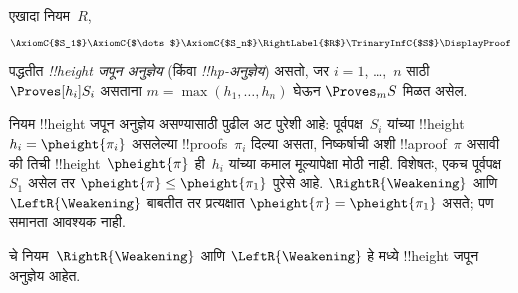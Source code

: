 \documentclass[../../../include/open-logic-section]{subfiles}
\begin{document}
\begin{defn}
एखादा नियम~$R$,
\[
\AxiomC{$S_1$}
\AxiomC{$\dots$}
\AxiomC{$S_n$}
\RightLabel{$R$}
\TrinaryInfC{$S$}
\DisplayProof
\]
पद्धतीत \emph{!!{height} जपून अनुज्ञेय} (किंवा
\emph{!!{hp}-अनुज्ञेय}) असतो, जर $i = 1$, \dots,~$n$
साठी $\Proves[h_i] S_i$ असताना $m = \max(h_1, \dots,
h_n)$ घेऊन $\Proves_m S$ मिळत असेल.
\end{defn}

नियम !!{height} जपून अनुज्ञेय असण्यासाठी पुढील अट
पुरेशी आहे: पूर्वपक्ष~$S_i$ यांच्या !!{height}~$h_i =
\pheight{\pi_i}$ असलेल्या !!{proof}s~$\pi_i$ दिल्या
असता, निष्कर्षाची अशी !!a{proof}~$\pi$ असावी की
तिची !!{height}~$\pheight{\pi}$ ही~$h_i$ यांच्या कमाल
मूल्यापेक्षा मोठी नाही. विशेषतः, एकच पूर्वपक्ष~$S_1$
असेल तर $\pheight{\pi} \le \pheight{\pi_1}$ पुरेसे
आहे. $\RightR{\Weakening}$ आणि $\LeftR{\Weakening}$
बाबतीत तर प्रत्यक्षात $\pheight{\pi} =
\pheight{\pi_1}$ असते; पण समानता आवश्यक नाही.

\begin{prop}
 चे नियम~$\RightR{\Weakening}$ आणि
$\LeftR{\Weakening}$ हे  मध्ये
!!{height} जपून अनुज्ञेय आहेत.
\end{prop}
\end{document}
